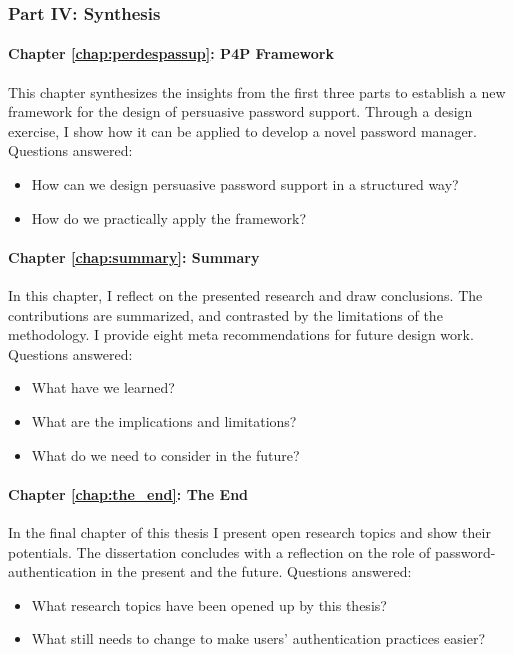 \subsubsection{Part IV: Synthesis}
\paragraph{Chapter \ref{chap:perdespassup}: P4P Framework} %
This chapter synthesizes the insights from the first three parts to establish a new framework for the design of persuasive password support. Through a design exercise, I show how it can be applied to develop a novel password manager. 
Questions answered: \vspace*{-5pt} \begin{itemize}[leftmargin=*,itemsep=-5pt]
	\item How can we design persuasive password support in a structured way?
	\item How do we practically apply the framework?
\end{itemize}

\paragraph{Chapter \ref{chap:summary}: Summary} %
In this chapter, I reflect on the presented research and draw conclusions. The contributions are summarized, and contrasted by the limitations of the methodology. I provide eight meta recommendations for future design work. 
Questions answered: \vspace*{-5pt} \begin{itemize}[leftmargin=*,itemsep=-5pt]
	\item What have we learned?
	\item What are the implications and limitations?
	\item What do we need to consider in the future?
\end{itemize}

\paragraph{Chapter \ref{chap:the_end}: The End} %
In the final chapter of this thesis I present open research topics and show their potentials. The dissertation concludes with a reflection on the role of password-authentication in the present and the future. 
Questions answered: \vspace*{-5pt} \begin{itemize}[leftmargin=*,itemsep=-5pt]
	\item What research topics have been opened up by this thesis?
	\item What still needs to change to make users' authentication practices easier?
\end{itemize}
